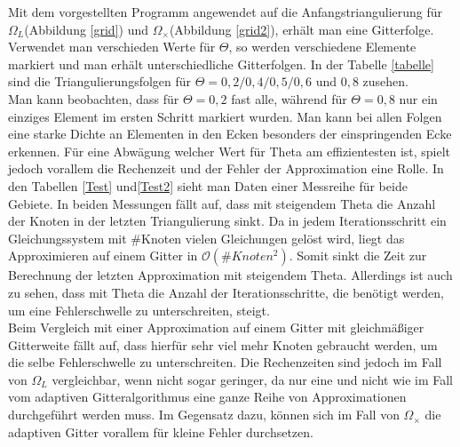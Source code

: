 Mit dem vorgestellten \matlab \:Programm angewendet auf die Anfangstriangulierung für $\Omega_L$(Abbildung \ref{grid}) und $\Omega_\times$(Abbildung \ref{grid2}), erhält man eine Gitterfolge. Verwendet man verschieden Werte für $\Theta$, so werden verschiedene Elemente markiert und man erhält unterschiedliche Gitterfolgen. In der Tabelle \ref{tabelle} sind die Triangulierungsfolgen für $\Theta =0,2/0,4/0,5/0,6 \text{ und } 0,8$ zusehen. \\
Man kann beobachten, dass für $\Theta = 0,2$ fast alle, während für $\Theta = 0,8$ nur ein einziges Element im ersten Schritt markiert wurden. Man kann bei allen Folgen eine starke Dichte an Elementen in den Ecken besonders der einspringenden Ecke erkennen. Für eine Abwägung welcher Wert für Theta am effizientesten ist, spielt jedoch vorallem die Rechenzeit und der Fehler der Approximation eine Rolle. In den Tabellen \ref{Test} und\ref{Test2} sieht man Daten einer Messreihe für beide Gebiete. In beiden Messungen fällt auf, dass mit steigendem Theta die Anzahl der Knoten in der letzten Triangulierung sinkt. Da in jedem Iterationsschritt ein Gleichungssystem mit \#Knoten vielen Gleichungen gelöst wird, liegt das Approximieren auf einem Gitter in $\mathcal{O}(\#Knoten^2)$. Somit sinkt die Zeit zur Berechnung der letzten Approximation mit steigendem Theta. Allerdings ist auch zu sehen, dass mit Theta die Anzahl der Iterationsschritte, die benötigt werden, um eine Fehlerschwelle zu unterschreiten, steigt.\\
Beim Vergleich mit einer Approximation auf einem Gitter mit gleichmäßiger Gitterweite fällt auf, dass hierfür sehr viel mehr Knoten gebraucht werden, um die selbe Fehlerschwelle zu unterschreiten. Die Rechenzeiten sind jedoch im Fall von $\Omega_L$ vergleichbar, wenn nicht sogar geringer, da nur eine und nicht wie im Fall vom adaptiven Gitteralgorithmus eine ganze Reihe von Approximationen durchgeführt werden muss. Im Gegensatz dazu, können sich im Fall von $\Omega_\times$ die adaptiven Gitter vorallem für kleine Fehler durchsetzen.\\



